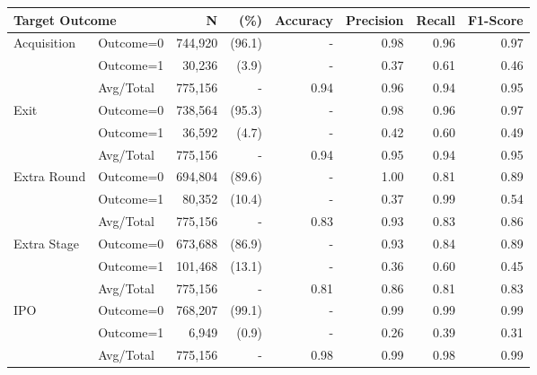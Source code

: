 \begin{tabular}{llrrrrrr} \toprule
\multicolumn{2}{l}{Target Outcome}
                        & N         & (\%)      & Accuracy  & Precision & Recall    & F1-Score  \\ \midrule
Acquisition & Outcome=0 & 744,920   & (96.1)    & -         & 0.98      & 0.96      & 0.97      \\
            & Outcome=1 & 30,236    & (3.9)     & -         & 0.37      & 0.61      & 0.46      \\
            & Avg/Total & 775,156   & -         & 0.94      & 0.96      & 0.94      & 0.95      \\
Exit        & Outcome=0 & 738,564   & (95.3)    & -         & 0.98      & 0.96      & 0.97      \\
            & Outcome=1 & 36,592    & (4.7)     & -         & 0.42      & 0.60      & 0.49      \\
            & Avg/Total & 775,156   & -         & 0.94      & 0.95      & 0.94      & 0.95      \\
Extra Round & Outcome=0 & 694,804   & (89.6)    & -         & 1.00      & 0.81      & 0.89      \\
            & Outcome=1 & 80,352    & (10.4)    & -         & 0.37      & 0.99      & 0.54      \\
            & Avg/Total & 775,156   & -         & 0.83      & 0.93      & 0.83      & 0.86      \\
Extra Stage & Outcome=0 & 673,688   & (86.9)    & -         & 0.93      & 0.84      & 0.89      \\
            & Outcome=1 & 101,468   & (13.1)    & -         & 0.36      & 0.60      & 0.45      \\
            & Avg/Total & 775,156   & -         & 0.81      & 0.86      & 0.81      & 0.83      \\
IPO         & Outcome=0 & 768,207   & (99.1)    & -         & 0.99      & 0.99      & 0.99      \\
            & Outcome=1 & 6,949     & (0.9)     & -         & 0.26      & 0.39      & 0.31      \\
            & Avg/Total & 775,156   & -         & 0.98      & 0.99      & 0.98      & 0.99      \\
\bottomrule \end{tabular}
